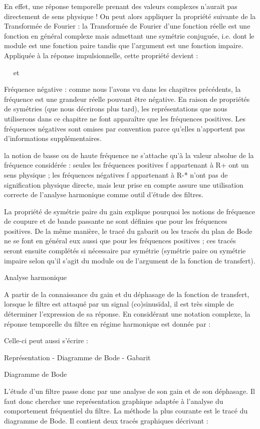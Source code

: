 \documentclass[]{article}
\begin{document}
En effet, une réponse temporelle prenant des valeurs complexes n'aurait
pas directement de sens physique ! On peut alors appliquer la propriété
suivante de la Transformée de Fourier : la Transformée de Fourier d'une
fonction réelle est une fonction en général complexe mais admettant une
symétrie conjuguée, i.e. dont le module est une fonction paire tandis
que l'argument est une fonction impaire. Appliquée à la réponse
impulsionnelle, cette propriété devient :

~~ et ~

Fréquence négative : comme nous l'avons vu dans les chapitres
précédents, la fréquence est une grandeur réelle pouvant être négative.
En raison de propriétés de symétries (que nous décrirons plus tard), les
représentations que nous utiliserons dans ce chapitre ne font apparaître
que les fréquences positives. Les fréquences négatives sont omises par
convention parce qu'elles n'apportent pas d'informations
supplémentaires.

la notion de basse ou de haute fréquence ne s'attache qu'à la valeur
absolue de la fréquence considérée : seules les fréquences positives f
appartenant à R+ ont un sens physique ; les fréquences négatives f
appartenant à R-* n'ont pas de signification physique directe, mais leur
prise en compte assure une utilisation correcte de l'analyse harmonique
comme outil d'étude des filtres.

La propriété de symétrie paire du gain explique pourquoi les notions de
fréquence de coupure et de bande passante ne sont définies que pour les
fréquences positives. De la même manière, le tracé du gabarit ou les
tracés du plan de Bode ne se font en général eux aussi que pour les
fréquences positives ; ces tracés seront ensuite complétés si nécessaire
par symétrie (symétrie paire ou symétrie impaire selon qu'il s'agit du
module ou de l'argument de la fonction de transfert).

Analyse harmonique

A partir de la connaissance du gain et du déphasage de la fonction de
transfert, lorsque le filtre est attaqué par un signal (co)sinusïdal, il
est très simple de déterminer l'expression de sa réponse. En considérant
une notation complexe, la réponse temporelle du filtre en régime
harmonique est donnée par :

Celle-ci peut aussi s'écrire :

Représentation - Diagramme de Bode - Gabarit

Diagramme de Bode

L'étude d'un filtre passe donc par une analyse de son gain et de son
déphasage. Il faut donc chercher une représentation graphique adaptée à
l'analyse du comportement fréquentiel du filtre. La méthode la plus
courante est le tracé du diagramme de Bode. Il contient deux tracés
graphiques décrivant :
\end{document}
